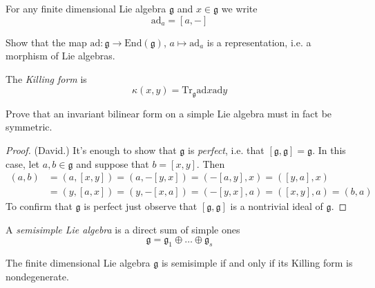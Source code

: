 \begin{definition}
\label{definition-ad}
For any finite dimensional Lie algebra  $\mathfrak{g}$ and $x \in \mathfrak{g}$
we write
$$
\text{ad}_a=[a,-]
$$
\end{definition}

\begin{exercise}
\label{exercise-adjoint-representation}
Show that the map $\text{ad}:\mathfrak{g}\to \text{End}(\mathfrak{g})$,
$a \mapsto \text{ad}_a$ is a representation, 
i.e. a morphism of Lie algebras.
\end{exercise}

\begin{definition}
\label{definition-Killing-form}
The {\it Killing form} is
$$
\kappa(x,y)=\text{Tr}_{\mathfrak{g}}\text{ad}x\text{ad}y
$$
\end{definition}

\begin{exercise}
\label{exercise-invariant-bilinear-form-on-simple-Lie-algebra-is-symmetric}
Prove that an invariant bilinear form on a simple Lie algebra must in fact be
symmetric.
\end{exercise}

\begin{proof}
(David.) It's enough to show that $\mathfrak{g}$ is
{\it perfect}, i.e. that $[\mathfrak{g},\mathfrak{g}]=\mathfrak{g}$. In this
case, let $a,b \in \mathfrak{g}$ and suppose that $b=[x,y]$. Then
\begin{align*}
(a,b)&=(a,[x,y])=(a,-[y,x])=(-[a,y],x)=([y,a],x)\\
&=(y,[a,x])=(y,-[x,a])=(-[y,x],a)=([x,y],a)=(b,a)
\end{align*}
To confirm that $\mathfrak{g}$ is perfect just observe that
$[\mathfrak{g},\mathfrak{g}]$ is a nontrivial ideal of $\mathfrak{g}$.
\end{proof}

\begin{definition}
\label{definition-semisimple-Lie-algebra}
A {\it semisimple Lie algebra} is a direct sum of simple ones
$$
\mathfrak{g}=\mathfrak{g}_1\oplus\ldots\oplus\mathfrak{g}_s
$$
\end{definition}

\begin{theorem}[Cartan]
\label{theorem-finite-dimensional-Lie-algebra-is
-semisimple-iff-Killing-form-is-nondegenerate}
The finite dimensional Lie algebra $\mathfrak{g}$ is semisimple if and only if
its Killing form is nondegenerate.
\end{theorem}

